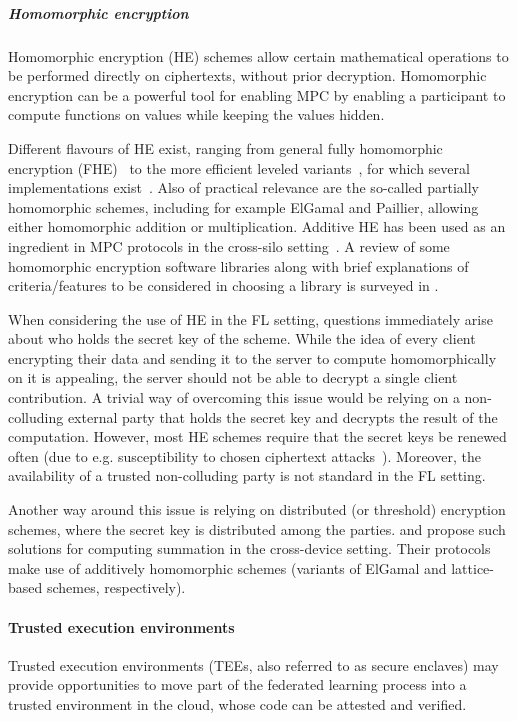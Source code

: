 \documentclass[11pt]{article}
\begin{document}
\subparagraph{Homomorphic encryption}
Homomorphic encryption (HE) schemes allow certain mathematical operations to be performed directly on ciphertexts, without prior decryption.  Homomorphic encryption can be a powerful tool for enabling MPC by enabling a participant to compute functions on values while keeping the values hidden.

Different flavours of HE exist, ranging from general fully homomorphic encryption (FHE)~\cite{gentry2009fully} to the more efficient leveled variants~\cite{BFV1, BFV2, BGV, DBLP:conf/pkc/CoronLT14}, for which several implementations exist~\cite{HElib, SEAL, Palisade, SHELL, lattigo}. Also of practical relevance are the so-called partially homomorphic schemes, including for example ElGamal and Paillier, allowing either homomorphic addition or multiplication. Additive HE has been used as an ingredient in MPC protocols in the cross-silo setting~\cite{DBLP:conf/sp/NikolaenkoWIJBT13, Hardy2017-da}.
A review of some homomorphic encryption software libraries along with brief explanations of criteria/features to be considered in choosing a library is surveyed in \cite{sathya2018review}.\par
When considering the use of HE in the FL setting, questions immediately arise about
who holds the secret key of the scheme. While the idea of every client encrypting 
their data and sending it to the server to compute homomorphically 
on it is appealing, the server should not be able to decrypt a single client contribution.
A trivial way of overcoming this issue would be relying on a non-colluding external
party that holds the secret key and decrypts the result of the computation.
However, most HE schemes require that the secret keys be renewed often (due to e.g. susceptibility to chosen ciphertext attacks~\cite{DBLP:conf/latincrypt/ChenalT14}). Moreover, the availability of a trusted non-colluding 
party is not standard in the FL setting. 

Another way around this issue is relying on distributed (or threshold) encryption schemes, where the secret key is distributed among the parties. \citet{hatelove} and \citet{DBLP:conf/sosp/RothNFH19} propose such solutions for computing summation in the cross-device setting. Their protocols make use of additively homomorphic schemes (variants of ElGamal and lattice-based schemes, respectively).

\paragraph{Trusted execution environments}
Trusted execution environments (TEEs, also referred to as secure enclaves) may provide opportunities to move part of the federated learning process into a trusted environment in the cloud, whose code can be attested and verified.
\end{document}
